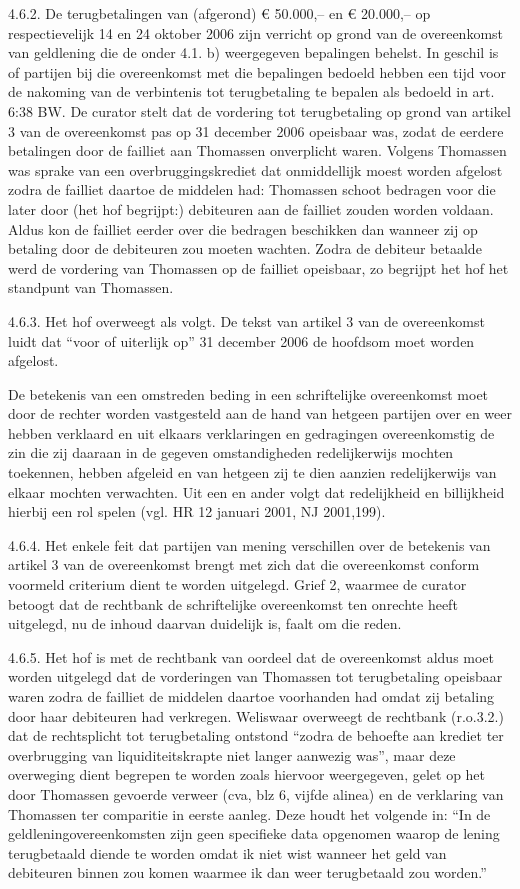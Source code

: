 \documentclass[
  dutch,
  a4paper,
]{article}
\begin{document}
4.6.2. De terugbetalingen van (afgerond) € 50.000,-- en € 20.000,-- op respectievelijk 14 en 24 oktober 2006 zijn verricht op grond van de overeenkomst van geldlening die de onder 4.1. b) weergegeven bepalingen behelst. In geschil is of partijen bij die overeenkomst met die bepalingen bedoeld hebben een tijd voor de nakoming van de verbintenis tot terugbetaling te bepalen als bedoeld in art. 6:38 BW. De curator stelt dat de vordering tot terugbetaling op grond van artikel 3 van de overeenkomst pas op 31 december 2006 opeisbaar was, zodat de eerdere betalingen door de failliet aan Thomassen onverplicht waren. Volgens Thomassen was sprake van een overbruggingskrediet dat onmiddellijk moest worden afgelost zodra de failliet daartoe de middelen had: Thomassen schoot bedragen voor die later door (het hof begrijpt:) debiteuren aan de failliet zouden worden voldaan. Aldus kon de failliet eerder over die bedragen beschikken dan wanneer zij op betaling door de debiteuren zou moeten wachten. Zodra de debiteur betaalde werd de vordering van Thomassen op de failliet opeisbaar, zo begrijpt het hof het standpunt van Thomassen.

4.6.3. Het hof overweegt als volgt. De tekst van artikel 3 van de overeenkomst luidt dat ``voor of uiterlijk op'' 31 december 2006 de hoofdsom moet worden afgelost.

De betekenis van een omstreden beding in een schriftelijke overeenkomst moet door de rechter worden vastgesteld aan de hand van hetgeen partijen over en weer hebben verklaard en uit elkaars verklaringen en gedragingen overeenkomstig de zin die zij daaraan in de gegeven omstandigheden redelijkerwijs mochten toekennen, hebben afgeleid en van hetgeen zij te dien aanzien redelijkerwijs van elkaar mochten verwachten. Uit een en ander volgt dat redelijkheid en billijkheid hierbij een rol spelen (vgl. HR 12 januari 2001, NJ 2001,199).

4.6.4. Het enkele feit dat partijen van mening verschillen over de betekenis van artikel 3 van de overeenkomst brengt met zich dat die overeenkomst conform voormeld criterium dient te worden uitgelegd. Grief 2, waarmee de curator betoogt dat de rechtbank de schriftelijke overeenkomst ten onrechte heeft uitgelegd, nu de inhoud daarvan duidelijk is, faalt om die reden.

4.6.5. Het hof is met de rechtbank van oordeel dat de overeenkomst aldus moet worden uitgelegd dat de vorderingen van Thomassen tot terugbetaling opeisbaar waren zodra de failliet de middelen daartoe voorhanden had omdat zij betaling door haar debiteuren had verkregen. Weliswaar overweegt de rechtbank (r.o.3.2.) dat de rechtsplicht tot terugbetaling ontstond ``zodra de behoefte aan krediet ter overbrugging van liquiditeitskrapte niet langer aanwezig was'', maar deze overweging dient begrepen te worden zoals hiervoor weergegeven, gelet op het door Thomassen gevoerde verweer (cva, blz 6, vijfde alinea) en de verklaring van Thomassen ter comparitie in eerste aanleg. Deze houdt het volgende in: ``In de geldleningovereenkomsten zijn geen specifieke data opgenomen waarop de lening terugbetaald diende te worden omdat ik niet wist wanneer het geld van debiteuren binnen zou komen waarmee ik dan weer terugbetaald zou worden.''
\end{document}
